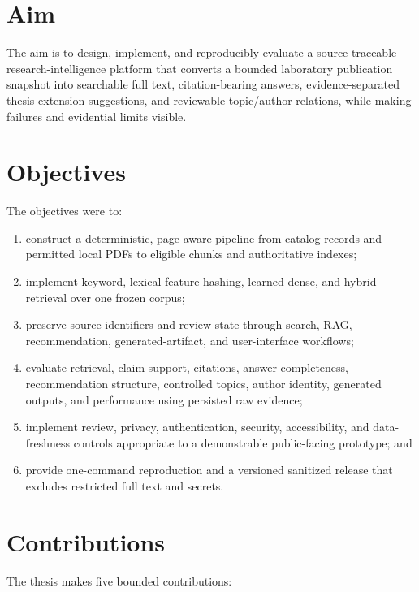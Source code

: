 \section{Aim}

The aim is to design, implement, and reproducibly evaluate a source-traceable research-intelligence platform that converts a bounded laboratory publication snapshot into searchable full text, citation-bearing answers, evidence-separated thesis-extension suggestions, and reviewable topic/author relations, while making failures and evidential limits visible.

\section{Objectives}

The objectives were to:

\begin{enumerate}[label=O\arabic*.,leftmargin=13mm]
  \item construct a deterministic, page-aware pipeline from catalog records and permitted local PDFs to eligible chunks and authoritative indexes;
  \item implement keyword, lexical feature-hashing, learned dense, and hybrid retrieval over one frozen corpus;
  \item preserve source identifiers and review state through search, RAG, recommendation, generated-artifact, and user-interface workflows;
  \item evaluate retrieval, claim support, citations, answer completeness, recommendation structure, controlled topics, author identity, generated outputs, and performance using persisted raw evidence;
  \item implement review, privacy, authentication, security, accessibility, and data-freshness controls appropriate to a demonstrable public-facing prototype; and
  \item provide one-command reproduction and a versioned sanitized release that excludes restricted full text and secrets.
\end{enumerate}

\section{Contributions}

The thesis makes five bounded contributions:

